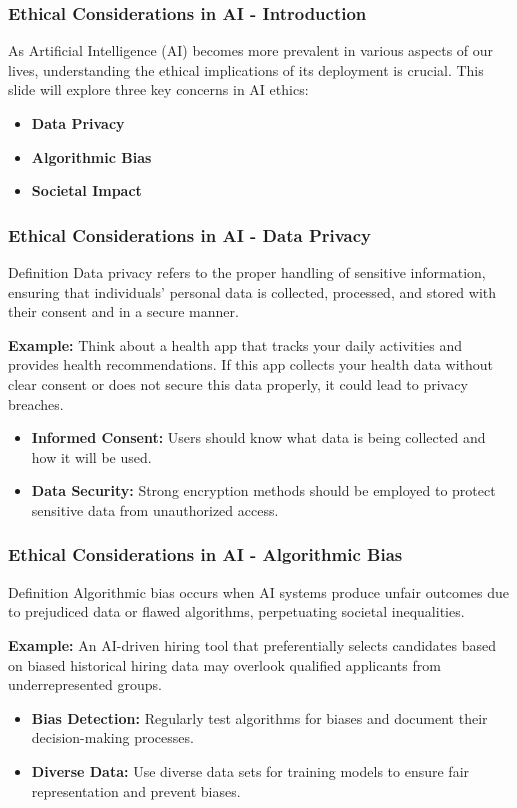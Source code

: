\documentclass[aspectratio=169]{beamer}
\begin{document}
\begin{frame}[fragile]
    \frametitle{Ethical Considerations in AI - Introduction}
    As Artificial Intelligence (AI) becomes more prevalent in various aspects of our lives, understanding the ethical implications of its deployment is crucial. 
    This slide will explore three key concerns in AI ethics: 
    \begin{itemize}
        \item \textbf{Data Privacy}
        \item \textbf{Algorithmic Bias}
        \item \textbf{Societal Impact}
    \end{itemize}
\end{frame}

\begin{frame}[fragile]
    \frametitle{Ethical Considerations in AI - Data Privacy}
    \begin{block}{Definition}
        Data privacy refers to the proper handling of sensitive information, ensuring that individuals' personal data is collected, processed, and stored with their consent and in a secure manner.
    \end{block}
    
    \textbf{Example:} Think about a health app that tracks your daily activities and provides health recommendations. If this app collects your health data without clear consent or does not secure this data properly, it could lead to privacy breaches.
    
    \begin{itemize}
        \item \textbf{Informed Consent:} Users should know what data is being collected and how it will be used.
        \item \textbf{Data Security:} Strong encryption methods should be employed to protect sensitive data from unauthorized access.
    \end{itemize}
\end{frame}

\begin{frame}[fragile]
    \frametitle{Ethical Considerations in AI - Algorithmic Bias}
    \begin{block}{Definition}
        Algorithmic bias occurs when AI systems produce unfair outcomes due to prejudiced data or flawed algorithms, perpetuating societal inequalities.
    \end{block}
    
    \textbf{Example:} An AI-driven hiring tool that preferentially selects candidates based on biased historical hiring data may overlook qualified applicants from underrepresented groups.
    
    \begin{itemize}
        \item \textbf{Bias Detection:} Regularly test algorithms for biases and document their decision-making processes.
        \item \textbf{Diverse Data:} Use diverse data sets for training models to ensure fair representation and prevent biases.
    \end{itemize}
\end{frame}
\end{document}
